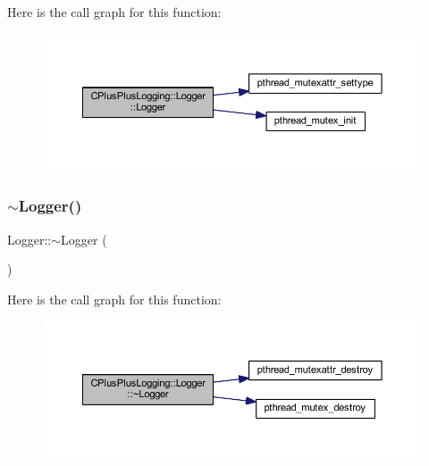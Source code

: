 Here is the call graph for this function\+:
\nopagebreak
\begin{figure}[H]
\begin{center}
\leavevmode
\includegraphics[width=350pt]{class_c_plus_plus_logging_1_1_logger_abc41bfb031d896170c7675fa96a6b30c_cgraph}
\end{center}
\end{figure}
\mbox{\label{class_c_plus_plus_logging_1_1_logger_acb668a9e186a25fbaad2e4af6d1ed00a}} 
\subsubsection{\texorpdfstring{$\sim$\+Logger()}{~Logger()}}
{\footnotesize\ttfamily Logger\+::$\sim$\+Logger (\begin{DoxyParamCaption}{ }\end{DoxyParamCaption})\hspace{0.3cm}{\ttfamily [protected]}}

Here is the call graph for this function\+:
\nopagebreak
\begin{figure}[H]
\begin{center}
\leavevmode
\includegraphics[width=350pt]{class_c_plus_plus_logging_1_1_logger_acb668a9e186a25fbaad2e4af6d1ed00a_cgraph}
\end{center}
\end{figure}


